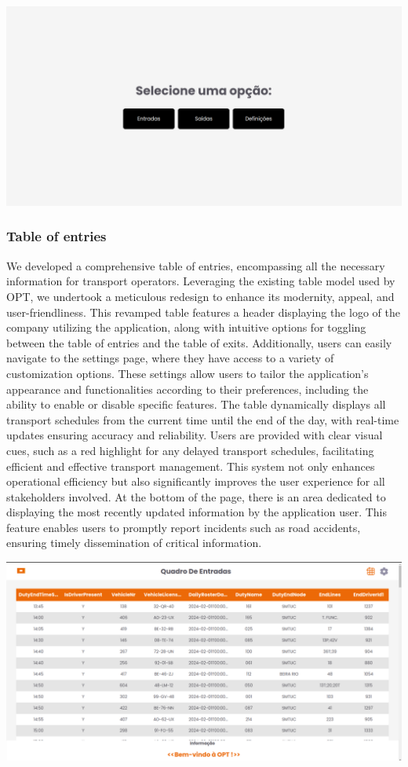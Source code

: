 \documentclass[10pt]{article}
\begin{document}
            \vfill
        \includegraphics[width=1\textwidth]{home_page}
            \vfill

        \subsubsection{Table of entries}

        We developed a comprehensive table of entries, encompassing all the necessary information for transport operators. Leveraging the existing table model used by OPT, we undertook a meticulous redesign to enhance its modernity, appeal, and user-friendliness. This revamped table features a header displaying the logo of the company utilizing the application, along with intuitive options for toggling between the table of entries and the table of exits.
        Additionally, users can easily navigate to the settings page, where they have access to a variety of customization options. These settings allow users to tailor the application's appearance and functionalities according to their preferences, including the ability to enable or disable specific features.
        The table dynamically displays all transport schedules from the current time until the end of the day, with real-time updates ensuring accuracy and reliability. Users are provided with clear visual cues, such as a red highlight for any delayed transport schedules, facilitating efficient and effective transport management. This system not only enhances operational efficiency but also significantly improves the user experience for all stakeholders involved.
        At the bottom of the page, there is an area dedicated to displaying the most recently updated information by the application user. This feature enables users to promptly report incidents such as road accidents, ensuring timely dissemination of critical information.

            \vfill
        \includegraphics[width=1\textwidth]{table_of_entries}
\end{document}
